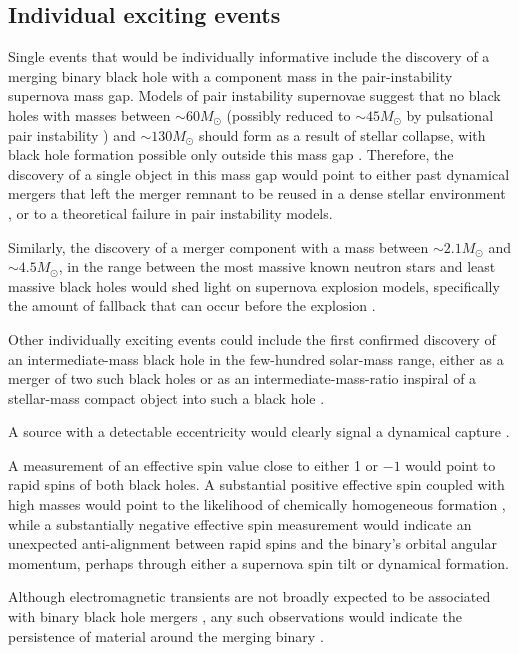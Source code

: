 \documentclass[iop,onecolumn]{revtex4-1}
\begin{document}
\subsection{Individual exciting events}
Single events that would be individually informative include the discovery of a merging binary black hole with a component mass in the pair-instability supernova mass gap.  Models of pair instability supernovae suggest that no black holes with masses between $\sim 60 M_\odot$ (possibly reduced to $\sim 45 M_\odot$ by pulsational pair instability \citep{Woosley:2017}) and $\sim 130 M_\odot$ should form as a result of stellar collapse, with black hole formation possible only outside this mass gap \citep{Marchant:2016}.  Therefore, the discovery of a single object in this mass gap would point to either past dynamical mergers that left the merger remnant to be reused in a dense stellar environment \citep{Rodriguez:2018}, or to a theoretical failure in pair instability models. 

Similarly, the discovery of a merger component with a mass between $\sim 2.1 M_\odot$ and $\sim 4.5 M_\odot$, in the range between the most massive known neutron stars and least massive black holes \citep{Ozel:2010,Farr:2011} would shed light on supernova explosion models, specifically the amount of fallback that can occur before the explosion \citep{Fryer:2012}.

Other individually exciting events could include the first confirmed discovery of an intermediate-mass black hole in the few-hundred solar-mass range, either as a merger of two such black holes \citep[e.g.,][]{AmaroSeoaneSantamaria:2009,Veitch:2015,Graff:2015} or as an intermediate-mass-ratio inspiral of a stellar-mass compact object into such a black hole \citep[e.g.,][]{Mandel:2008,Haster:2015IMRI,Haster:2016}. 

A source with a detectable eccentricity would clearly signal a dynamical capture \citep{Breivik:2016}. 

A measurement of an effective spin value close to either 1 or $-1$ would point to rapid spins of both black holes. A substantial positive effective spin coupled with high masses would point to the likelihood of chemically homogeneous formation \citep{Marchant:2016}, while a substantially negative effective spin measurement would indicate an unexpected anti-alignment between rapid spins and the binary's orbital angular momentum, perhaps through either a supernova spin tilt or dynamical formation.  

Although electromagnetic transients are not broadly expected to be associated with binary black hole mergers \citep[e.g.,][]{Lyutikov:2016}, any such observations would indicate the persistence of material around the merging binary \citep[e.g.,][]{deMinkKing:2017}.
\end{document}
